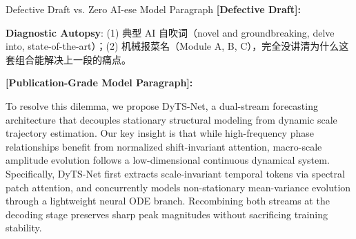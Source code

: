 \begin{ExampleBox}{Defective Draft vs. Zero AI-ese Model Paragraph}
\textbf{\color{TargetHighlight}[Defective Draft]:}\par
{}\par\vspace{4pt}
\textbf{Diagnostic Autopsy}: (1)  典型 AI 自吹词（novel and groundbreaking, delve into, state-of-the-art）；(2)  机械报菜名（Module A, B, C），完全没讲清为什么这套组合能解决上一段的痛点。\par\vspace{6pt}
\textbf{\color{AcadNavy}[Publication-Grade Model Paragraph]:}\par
To resolve this dilemma, we propose DyTS-Net, a dual-stream forecasting architecture that decouples stationary structural modeling from dynamic scale trajectory estimation. Our key insight is that while high-frequency phase relationships benefit from normalized shift-invariant attention, macro-scale amplitude evolution follows a low-dimensional continuous dynamical system. Specifically, DyTS-Net first extracts scale-invariant temporal tokens via spectral patch attention, and concurrently models non-stationary mean-variance evolution through a lightweight neural ODE branch. Recombining both streams at the decoding stage preserves sharp peak magnitudes without sacrificing training stability.
\end{ExampleBox}
